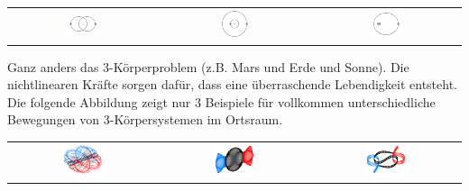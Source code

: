 \documentclass[12pt]{book}
\begin{document}
\begin{center}
\begin{tabular}{c c c}
\includegraphics[width=0.2\textwidth]{Bilder/Binary_system_orbit_q=1_e=0dot5.png}
&
\includegraphics[width=0.2\textwidth]{Bilder/Binary_system_orbit_q=3_e=0.png}
&
\includegraphics[width=0.2\textwidth]{Bilder/Binary_system_orbit_q=10_e=0dot5.png}
\end{tabular}
\end{center}

Ganz anders das 3-Körperproblem (z.B. Mars und Erde und Sonne). Die nichtlinearen Kräfte sorgen dafür, dass eine überraschende Lebendigkeit entsteht. Die folgende Abbildung zeigt nur 3 Beispiele für vollkommen unterschiedliche Bewegungen von 3-Körpersystemen im Ortsraum.

\begin{center}
\begin{tabular}{c c c}
\includegraphics[width=0.3\textwidth]{Bilder/3Koerper_Bumblebee.png}
&
\includegraphics[width=0.3\textwidth]{Bilder/3Koerper_Butterfly_IV.png}
&
\includegraphics[width=0.3\textwidth]{Bilder/3Koerper_Yin-Yang_2b.png}
\end{tabular}
\end{center}
\end{document}
